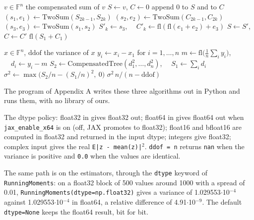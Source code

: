 \documentclass[11pt]{article}
\begin{document}
\begin{algorithm}[H]
\caption{CompensatedTree$(v)$}
\begin{algorithmic}[1]
\Require $v \in \mathbb{F}^n$
\Ensure the compensated sum of $v$
\State $S \gets v$, $C \gets 0$
\State append $0$ to $S$ and to $C$
\EndIf
{}
\State $(s_1,e_1) \gets \mathrm{TwoSum}(S_{2k-1},S_{2k})$
\State $(s_2,e_2) \gets \mathrm{TwoSum}(C_{2k-1},C_{2k})$
\State $(s_3,e_3) \gets \mathrm{TwoSum}(s_1,s_2)$
\State $S'_k \gets s_3$, $\quad C'_k \gets \mathrm{fl}(\mathrm{fl}(e_1+e_2)+e_3)$
\EndFor
\State $S \gets S'$, $C \gets C'$
\EndWhile
\State \Return $\mathrm{fl}(S_1 + C_1)$
\end{algorithmic}
\end{algorithm}

\begin{algorithm}[H]
\caption{StableVar$(x,\mathrm{ddof})$}
\begin{algorithmic}[1]
\Require $x \in \mathbb{F}^n$, $\mathrm{ddof}$
\Ensure the variance of $x$
\State $y_i \gets x_i - x_1$ for $i = 1,\dots,n$
\State $m \gets \mathrm{fl}\bigl(\tfrac{1}{n}\sum_i y_i\bigr)$, $\quad d_i \gets y_i - m$
\State $S_2 \gets \mathrm{CompensatedTree}(d_1^2,\dots,d_n^2)$, $\quad S_1 \gets \sum_i d_i$
\State $\sigma^2 \gets \max\bigl(S_2/n - (S_1/n)^2,\ 0\bigr)$
\State \Return $\sigma^2\, n/(n-\mathrm{ddof})$
\end{algorithmic}
\end{algorithm}

The program of Appendix A writes these three algorithms out in Python and runs them, with no library of ours.

The dtype policy: float32 in gives float32 out; float64 in gives float64 out when \texttt{jax\_enable\_x64} is on (off, JAX promotes to float32); float16 and bfloat16 are computed in float32 and returned in the input dtype; integers give float32; complex input gives the real \texttt{E|z - mean(z)|$^{2}$}. \texttt{ddof = n} returns \texttt{nan} when the variance is positive and \texttt{0.0} when the values are identical.

The same path is on the estimators, through the \texttt{dtype} keyword of \texttt{RunningMoments}: on a float32 block of 500 values around 1000 with a spread of 0.01, \texttt{RunningMoments(dtype=np.float32)} gives a variance of 1.029553$\cdot$10$^{-4}$ against 1.029553$\cdot$10$^{-4}$ in float64, a relative difference of 4.91$\cdot$10$^{-9}$. The default \texttt{dtype=None} keeps the float64 result, bit for bit.
\end{document}
